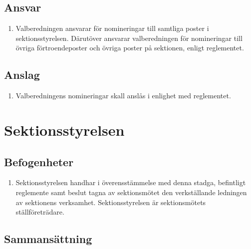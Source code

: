 \documentclass[11pt,a4paper]{article}
\begin{document}
\subsection{Ansvar}

\begin{enumerate}[\thesubsection .1]

  \item Valberedningen ansvarar för nomineringar till samtliga poster
  i sektionsstyrelsen. Därutöver ansvarar valberedningen för
  nomineringar till övriga förtroendeposter och övriga poster på sektionen, enligt
  reglementet.

\end{enumerate}

\subsection{Anslag}

\begin{enumerate}[\thesubsection .1]

  \item Valberedningens nomineringar skall anslås i enlighet med reglementet.

\end{enumerate}


\newpage




\section{Sektionsstyrelsen}
\label{sektionsstyrelsen}
\subsection{Befogenheter}

\begin{enumerate}[\thesubsection .1]

  \item Sektionsstyrelsen handhar i överens\-stäm\-melse med denna stadga, befintligt reglemente samt beslut tagna av sektionsmötet den verk\-ställ\-ande ledningen av sektionens verksamhet. Sektionsstyrelsen är sektions\-mötets ställ\-före\-trädare.

\end{enumerate}

\subsection{Sammansättning}
\end{document}
